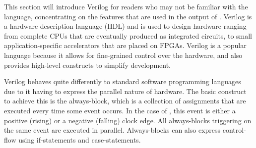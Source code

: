 This section will introduce Verilog for readers who may not be familiar with the language, concentrating on the features that are used in the output of \vericert{}.  Verilog is a hardware description language (HDL) and is used to design hardware ranging from complete CPUs that are eventually produced as integrated circuits, to small application-specific accelerators that are placed on FPGAs.  Verilog is a popular language because it allows for fine-grained control over the hardware, and also provides high-level constructs to simplify development.

Verilog behaves quite differently to standard software programming languages due to it having to express the parallel nature of hardware.  The basic construct to achieve this is the always-block, which is a collection of assignments that are executed every time some event occurs.  In the case of \vericert{}, this event is either a positive (rising) or a negative (falling) clock edge.  All always-blocks triggering on the same event are executed in parallel. Always-blocks can also express control-flow using if-statements and case-statements.

